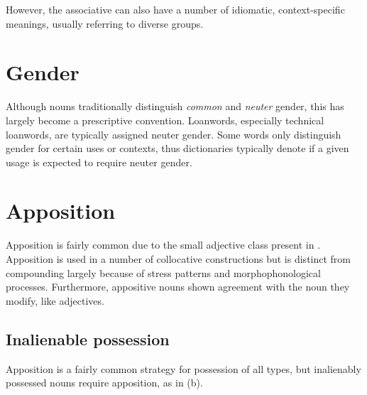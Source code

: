 
However, the associative can also have a number of idiomatic, context-specific meanings, usually referring to diverse groups.


\section{Gender}
Although nouns traditionally distinguish \emph{common} and \emph{neuter} gender, this has largely become a prescriptive convention.  Loanwords, especially technical loanwords, are typically assigned neuter gender. Some words only distinguish gender for certain uses or contexts, thus dictionaries typically denote if a given usage is expected to require neuter gender.

\section{Apposition}
Apposition is fairly common due to the small adjective class present in \langname{}. Apposition is used in a number of collocative constructions but is distinct from compounding largely because of stress patterns and morphophonological processes. Furthermore, appositive nouns shown agreement with the noun they modify, like adjectives.

\subsection{Inalienable possession}
Apposition is a fairly common strategy for possession of all types, but inalienably possessed nouns require apposition, as in (\nextx b).

